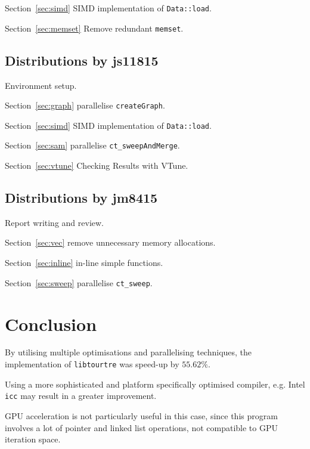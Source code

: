 \documentclass[conference]{IEEEtran}
\newcommand{\sref}[1]{Section~\ref{#1}}
\begin{document}
\sref{sec:simd} SIMD implementation of \texttt{Data::load}.

\sref{sec:memset} Remove redundant \texttt{memset}.


\subsection{Distributions by js11815}

Environment setup.

\sref{sec:graph} parallelise \texttt{createGraph}.

\sref{sec:simd} SIMD implementation of \texttt{Data::load}.

\sref{sec:sam} parallelise \texttt{ct\_sweepAndMerge}.

\sref{sec:vtune} Checking Results with VTune.


\subsection{Distributions by jm8415}

Report writing and review.

\sref{sec:vec} remove unnecessary memory allocations.

\sref{sec:inline} in-line simple functions.

\sref{sec:sweep} parallelise \texttt{ct\_sweep}.

\section{Conclusion}

By utilising multiple optimisations and parallelising techniques, the implementation of \texttt{libtourtre} was speed-up by $55.62 \%$.

Using a more sophisticated and platform specifically optimised compiler, e.g. Intel \texttt{icc} may result in a greater improvement.

GPU acceleration is not particularly useful in this case, since this program involves a lot of pointer and linked list operations, not compatible to GPU iteration space.




\end{document}
